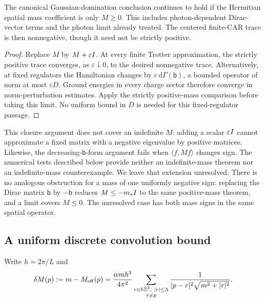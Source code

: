 \begin{proposition}
\label{prop:mass-gap-semidefinite}
The canonical Gaussian-domination conclusion continues to hold if the
Hermitian spatial mass coefficient is only $M\ge0$. This includes
photon-dependent Dirac-vector terms and the photon limit already treated.
The centered finite-CAR trace is then nonnegative, though it need not be
strictly positive.
\end{proposition}
\begin{proof}
Replace $M$ by $M+\varepsilon I$. At every finite Trotter approximation,
the strictly positive trace converges, as $\varepsilon\downarrow0$, to
the desired nonnegative trace. Alternatively, at fixed regulators the
Hamiltonian changes by $\varepsilon\,\mathrm d\Gamma(\mathsf b)$, a bounded
operator of norm at most $\varepsilon D$. Ground energies in every charge
sector therefore converge in norm-perturbation estimates. Apply the
strictly positive-mass comparison before taking this limit. No uniform
bound in $D$ is needed for this fixed-regulator passage.
\end{proof}

This closure argument does not cover an indefinite $M$: adding a scalar
$\varepsilon I$ cannot approximate a fixed matrix with a negative
eigenvalue by positive matrices. Likewise, the decreasing-$\mathsf b$-form
argument fails when $\langle f,Mf\rangle$ changes sign. The numerical
tests described below provide neither an indefinite-mass theorem nor an
indefinite-mass counterexample. We leave that extension unresolved.
There is no analogous obstruction for a mass of one uniformly negative
sign: replacing the Dirac matrix $\mathsf b$ by $-\mathsf b$ reduces
$M\le-m_*I$ to the same positive-mass theorem, and a limit covers
$M\le0$. The unresolved case has both mass signs in the same spatial
operator.

\subsection{A uniform discrete convolution bound}
\label{subsec:mass-gap-discrete}

Write $h=2\pi/L$ and
\begin{equation}
 \delta M(p):=m-M_{\mathrm{eff}}(p)
 =\frac{\alpha m h^3}{4\pi^2}
 \sum_{\substack{r\in h\mathbb Z^3,\ |r|\le\Lambda\\r\ne p}}
 \frac{1}{|p-r|^2\sqrt{m^2+|r|^2}}.
 \label{eq:mass-gap-deficit}
\end{equation}

